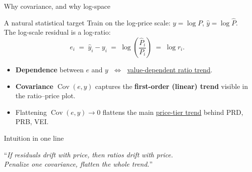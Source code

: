 \documentclass[aspectratio=169,12pt,]{beamer}
\newcommand{\Cov}{\operatorname{Cov}}
\newcommand{\1}{\mathbf{1}}
\begin{document}
\begin{frame}{Why covariance, and why log-space}

\begin{block}{ A natural statistical target}
Train on the log-price scale: $y=\log P$, $\hat y = \log \widehat P$. The log-scale residual is a log-ratio:
\vspace{-1mm}
\[
e_i \;=\; \hat y_i - y_i \;=\; \log\!\left(\frac{\widehat P_i}{P_i}\right) \;=\; \log r_i.
\]
\end{block}

\vspace{-1mm}

\begin{itemize}
    \item \textbf{Dependence} between $e$ and $y$ $\;\Leftrightarrow\;$ \underline{value-dependent ratio trend}.
    \medskip
    \item \textbf{Covariance} $\Cov(e, y)$ captures the \textbf{first-order (linear) trend} visible in the ratio--price plot.
    \medskip
    \item Flattening $\Cov(e, y) \to 0$ flattens the main \underline{price-tier trend} behind PRD, PRB, VEI.
\end{itemize}

\vspace{2mm}

\begin{block}{ Intuition in one line}
\begin{center}
``\textit{If residuals drift with price, then ratios drift with price.\\ Penalize one covariance, flatten the whole trend.}''
\end{center}
\end{block}

\end{frame}
\end{document}
